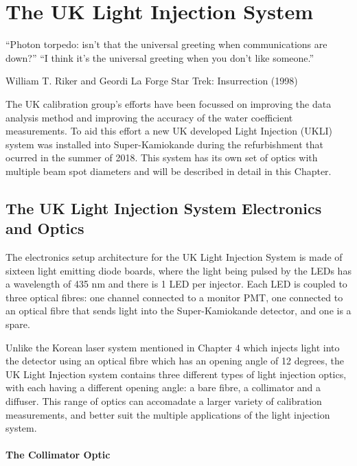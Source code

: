 \chapter{The UK Light Injection System}
\epigraph{``Photon torpedo: isn't that the universal greeting when communications are down?''\newline
``I think it's the universal greeting when you don't like someone.''}{William T. Riker and Geordi La Forge \newline Star Trek: Insurrection (1998)}
\label{chp:ukli}

The UK calibration group's efforts have been focussed on improving the data analysis method and improving the accuracy of the water coefficient measurements. To aid this effort a new UK developed Light Injection (UKLI) system was installed into Super-Kamiokande during the refurbishment that ocurred in the summer of 2018. This system has its own set of optics with multiple beam spot diameters and will be described in detail in this Chapter. 

\section{The UK Light Injection System Electronics and Optics}

The electronics setup architecture for the UK Light Injection System is made of sixteen light emitting diode boards, where the light being pulsed by the LEDs has a wavelength of 435 nm and there is 1 LED per injector. Each LED is coupled to three optical fibres: one channel connected to a monitor PMT, one connected to an optical fibre that sends light into the Super-Kamiokande detector, and one is a spare.
\newline

Unlike the Korean laser system mentioned in Chapter 4 which injects light into the detector using an optical fibre which has an opening angle of 12 degrees, the UK Light Injection system contains three different types of light injection optics, with each having a different opening angle: a bare fibre, a collimator and a diffuser. This range of optics can accomadate a larger variety of calibration measurements, and better suit the multiple applications of the light injection system. 

\subsubsection{The Collimator Optic}

